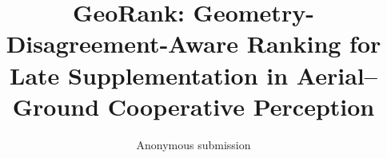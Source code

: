 \documentclass[10pt,twocolumn,letterpaper]{article}
\title{GeoRank: Geometry-Disagreement-Aware Ranking for Late Supplementation in Aerial--Ground Cooperative Perception}
\author{Anonymous submission}
\begin{document}
\maketitle


\FloatBarrier
{\small}
\end{document}
